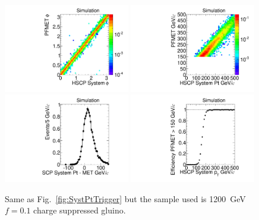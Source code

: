 \begin{figure}
  \begin{center}
      \includegraphics[clip=false, trim=0.0cm 0cm 0.0cm 0cm, width=0.49\textwidth]{figures/search/Gluino_8TeV_M1200N_f10SystPhiMET}
      \includegraphics[clip=false, trim=0.0cm 0cm 0.0cm 0cm, width=0.49\textwidth]{figures/search/Gluino_8TeV_M1200N_f10SystPtMET} \\
      \includegraphics[clip=false, trim=0.0cm 0cm 0.0cm 0cm, width=0.49\textwidth]{figures/search/Gluino_8TeV_M1200N_f10SystPtDiffMET}
      \includegraphics[clip=false, trim=0.0cm 0cm 0.0cm 0cm, width=0.49\textwidth]{figures/search/Gluino_8TeV_M1200N_f10SystPtEff}
      \caption[Comparison of di-HSCP system $\phi$ and \pt\ with online PFMET for a 1200~GeV
gluino $f=0.1$ charge suppressed sample in events with at least 150~GeV of online PFMET]
      {Same as Fig.~\ref{fig:SystPtTrigger} but the sample used is 1200~GeV $f=0.1$ charge suppressed gluino.
        }
      \label{fig:SystPtTriggerN}
  \end{center}
\end{figure}

